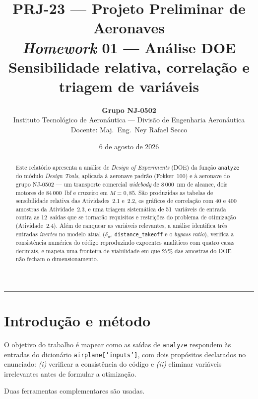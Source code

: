\documentclass[11pt,a4paper]{article}
\title{\vspace{-1.2cm}\textbf{PRJ-23 --- Projeto Preliminar de Aeronaves}\\[0.25cm]
\Large \emph{Homework} 01 --- An\'alise DOE\\[0.35cm]
\large Sensibilidade relativa, correla\c{c}\~ao e triagem de vari\'aveis}
\author{\textbf{Grupo NJ-0502}\\[0.15cm]
Instituto Tecnol\'ogico de Aeron\'autica --- Divis\~ao de Engenharia Aeron\'autica\\
Docente: Maj.\ Eng.\ Ney Rafael Secco}
\date{6 de agosto de 2026}
\newcommand{\code}[1]{\texttt{\small #1}}
\begin{document}
\maketitle
\thispagestyle{fancy}

\begin{abstract}
\noindent
Este relat\'orio apresenta a an\'alise de \emph{Design of Experiments} (DOE) da
fun\c{c}\~ao \code{analyze} do m\'odulo \emph{Design Tools}, aplicada \`a
aeronave padr\~ao (Fokker~100) e \`a aeronave do grupo NJ-0502 --- um
transporte comercial \emph{widebody} de $8\,000$~nm de alcance, dois motores de
$84\,000$~lbf e cruzeiro em $M = 0{,}85$. S\~ao produzidas as tabelas de
sensibilidade relativa das Atividades~2.1 e~2.2, os gr\'aficos de correla\c{c}\~ao
com 40 e 400 amostras da Atividade~2.3, e uma triagem sistem\'atica de
51~vari\'aveis de entrada contra as 12~sa\'idas que se tornar\~ao requisitos e
restri\c{c}\~oes do problema de otimiza\c{c}\~ao (Atividade~2.4). Al\'em de
ranquear as vari\'aveis relevantes, a an\'alise identifica tr\^es entradas
\emph{inertes} no modelo atual ($\delta_w$, \code{distance\_takeoff} e o
\emph{bypass ratio}), verifica a consist\^encia num\'erica do c\'odigo
reproduzindo expoentes anal\'iticos com quatro casas decimais, e mapeia uma
fronteira de viabilidade em que $27\%$ das amostras do DOE n\~ao fecham o
dimensionamento.
\end{abstract}

\vspace{0.3cm}
\hrule
\vspace{0.5cm}

\section{Introdu\c{c}\~ao e m\'etodo}

O objetivo do trabalho \'e mapear como as sa\'idas de \code{analyze} respondem
\`as entradas do dicion\'ario \code{airplane['inputs']}, com dois prop\'ositos
declarados no enunciado: \emph{(i)} verificar a consist\^encia do c\'odigo e
\emph{(ii)} eliminar vari\'aveis irrelevantes antes de formular a
otimiza\c{c}\~ao.

Duas ferramentas complementares s\~ao usadas.
\end{document}
